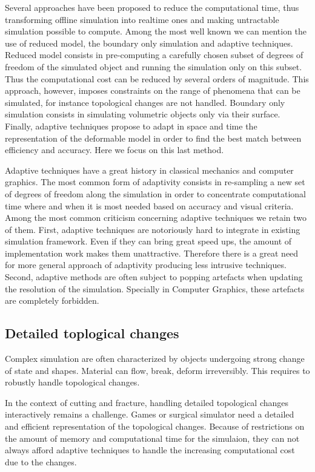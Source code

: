 Several approaches have been proposed to reduce the computational time, thus transforming offline simulation into realtime ones and making untractable simulation possible to compute. Among the most well known we can mention the use of reduced model, the boundary only simulation and adaptive techniques. Reduced model consists in pre-computing a carefully chosen subset of degrees of freedom of the simulated object and running the simulation only on this subset. Thus the computational cost can be reduced by several orders of magnitude. This approach, however, imposes constraints on the range of phenomena that can be simulated, for instance topological changes are not handled. Boundary only simulation consists in simulating volumetric objects only via their surface. Finally, adaptive techniques propose to adapt in space and time the representation of the deformable model in order to find the best match between efficiency and accuracy. Here we focus on this last method.

Adaptive techniques have a great history in classical mechanics and computer graphics. The most common form of adaptivity consists in re-sampling a new set of degrees of freedom along the simulation in order to concentrate computational time where and when it is most needed based on accuracy and visual criteria. Among the most common criticism concerning adaptive techniques we retain two of them. First, adaptive techniques are notoriously hard to integrate in existing simulation framework. Even if they can bring great speed ups, the amount of implementation work makes them unattractive. Therefore there is a great need for more general approach of adaptivity producing less intrusive techniques. Second, adaptive methods are often subject to popping artefacts when updating the resolution of the simulation. Specially in Computer Graphics, these artefacts are completely forbidden.

\subsection{Detailed toplogical changes}

Complex simulation are often characterized by objects undergoing strong change of state and shapes. Material can flow, break, deform irreversibly. This requires to robustly handle topological changes. 

In the context of cutting and fracture, handling detailed topological changes interactively remains a challenge. Games or surgical simulator need a detailed and efficient representation of the topological changes. Because of restrictions on the amount of memory and computational time for the simulaion, they can not always afford adaptive techniques to handle the increasing computational cost due to the changes.

